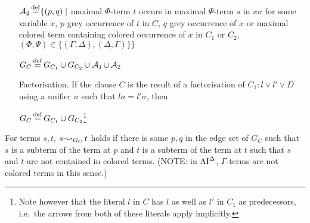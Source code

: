 \documentclass[,%
	draft=false,%
	numbers=noendperiod
	11pt,
	a4paper,
	oneside,%
	openany,
]{memoir}
\begin{document}
\begin{defi}
\begin{itemize}
			$\operatorname{\mathcal{A}}_2 \operatorname{\stackrel{\mathrm{def}}{=}} \{ (p, q) \mid $ maximal $\Phi$-term $t$ occurs in maximal $\Psi$-term $s$ in $x\sigma$ for some variable $x$, $p$ grey occurrence of $t$ in $C$, $q$ grey occurrence of $x$ or maximal colored term containing colored occurrence of $x$ in $C_1$ or $C_2$,
			$(\Phi, \Psi) \in \{(\Gamma, \Delta), (\Delta, \Gamma)\} \} $ 


			$G_C \operatorname{\stackrel{\mathrm{def}}{=}} G_{C_1} \cup G_{C_2} \cup \operatorname{\mathcal{A}}_1 \cup \operatorname{\mathcal{A}}_2$


		\item[Factorisation.]
			If the clause $C$ is the result of a factorisation of $C_1: l \lor l' \lor D$ using a unifier $\sigma$ such that $l\sigma = l'\sigma$, then 

			$G_C \operatorname{\stackrel{\mathrm{def}}{=}} G_{C_1} \cup G_{C_2}$\footnote{Note however that the literal $l$ in $C$ has $l$ as well as $l'$ in $C_1$ as predecessors, i.e.~the arrows from both of these literals apply implicitly.}
			\qedhere
	\end{itemize}
\end{defi}

\begin{defi}
	For terms $s, t$, $s\operatorname{\leadsto}_{G_C} t$ holds if there is some $p, q$ in the edge set of $G_C$ such that $s$ is a subterm of the term at $p$ and $t$ is a subterm of the term at $t$ such that $s$ and $t$ are not contained in colored terms. (NOTE: in $\operatorname{AI}^\Delta$, $\Gamma$-terms are not colored terms in this sense.)
\end{defi}
\end{document}
